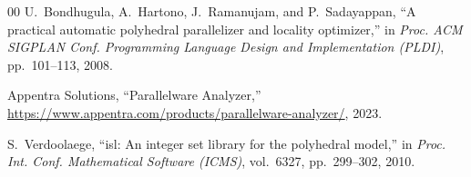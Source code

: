 \documentclass[conference]{IEEEtran}
\begin{document}
\begin{thebibliography}{00}
U.~Bondhugula, A.~Hartono, J.~Ramanujam, and P.~Sadayappan,
``A practical automatic polyhedral parallelizer and locality optimizer,''
in \textit{Proc. ACM SIGPLAN Conf. Programming Language Design and
Implementation (PLDI)}, pp.~101--113, 2008.

Appentra Solutions,
``Parallelware Analyzer,''
\url{https://www.appentra.com/products/parallelware-analyzer/}, 2023.

S.~Verdoolaege,
``{isl}: An integer set library for the polyhedral model,''
in \textit{Proc. Int. Conf. Mathematical Software (ICMS)},
vol.~6327, pp.~299--302, 2010.

\end{thebibliography}
\end{document}
